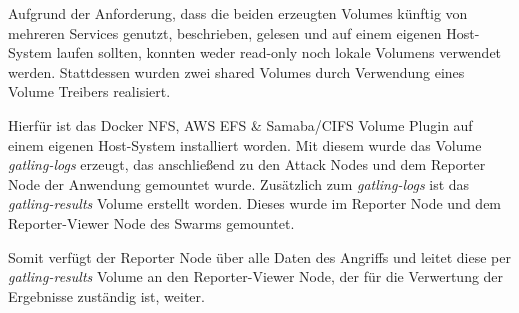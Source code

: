 Aufgrund der Anforderung, dass die beiden erzeugten Volumes künftig von mehreren Services genutzt, beschrieben, gelesen und auf einem eigenen Host-System laufen sollten, konnten weder read-only noch lokale Volumens verwendet werden. 
Stattdessen wurden zwei shared Volumes durch Verwendung eines Volume Treibers realisiert.

Hierfür ist das Docker NFS, AWS EFS \& Samaba/CIFS Volume Plugin auf einem eigenen Host-System installiert worden.
Mit diesem wurde das Volume \textit{gatling-logs} erzeugt, das anschließend zu den Attack Nodes und dem Reporter Node der Anwendung gemountet wurde. 
Zusätzlich zum \textit{gatling-logs} ist das \textit{gatling-results} Volume erstellt worden. 
Dieses wurde im Reporter Node und dem Reporter-Viewer Node des Swarms gemountet.

Somit verfügt der Reporter Node über alle Daten des Angriffs und leitet diese per \textit{gatling-results} Volume an den Reporter-Viewer Node, der für die Verwertung der Ergebnisse zuständig ist, weiter.
